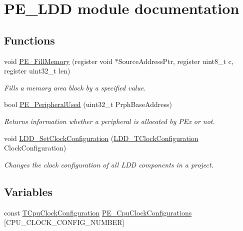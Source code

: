 \hypertarget{group___p_e___l_d_d__module}{}\section{P\+E\+\_\+\+L\+D\+D module documentation}
\label{group___p_e___l_d_d__module}
\subsection*{Functions}
\begin{DoxyCompactItemize}
\item 
void \hyperlink{group___p_e___l_d_d__module_ga6cb22864b71fd00f200c9fb3375f4e29}{P\+E\+\_\+\+Fill\+Memory} (register void $\ast$Source\+Address\+Ptr, register uint8\+\_\+t c, register uint32\+\_\+t len)
\begin{DoxyCompactList}\small\item\em Fills a memory area block by a specified value. \end{DoxyCompactList}\item 
bool \hyperlink{group___p_e___l_d_d__module_ga9e049b01a45212fe5b6a8476fe124b59}{P\+E\+\_\+\+Peripheral\+Used} (uint32\+\_\+t Prph\+Base\+Address)
\begin{DoxyCompactList}\small\item\em Returns information whether a peripheral is allocated by P\+Ex or not. \end{DoxyCompactList}\item 
void \hyperlink{group___p_e___l_d_d__module_ga7fe8a131453ba765c5e85130a282eafb}{L\+D\+D\+\_\+\+Set\+Clock\+Configuration} (\hyperlink{group___p_e___types__module_ga369bcaf7f00caad5f994c72ac2629a37}{L\+D\+D\+\_\+\+T\+Clock\+Configuration} Clock\+Configuration)
\begin{DoxyCompactList}\small\item\em Changes the clock configuration of all L\+D\+D components in a project. \end{DoxyCompactList}\end{DoxyCompactItemize}
\subsection*{Variables}
\begin{DoxyCompactItemize}
\item 
const \hyperlink{struct_t_cpu_clock_configuration}{T\+Cpu\+Clock\+Configuration} \hyperlink{group___p_e___l_d_d__module_gab69281f0e90d16198a5595ed7f471441}{P\+E\+\_\+\+Cpu\+Clock\+Configurations} \mbox{[}C\+P\+U\+\_\+\+C\+L\+O\+C\+K\+\_\+\+C\+O\+N\+F\+I\+G\+\_\+\+N\+U\+M\+B\+E\+R\mbox{]}
\end{DoxyCompactItemize}


